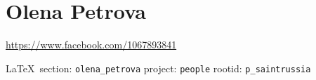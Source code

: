  
 
\section{Olena Petrova}
\url{https://www.facebook.com/1067893841}
  
\vspace{0.5cm}
 {	\ifDEBUG		\small		\LaTeX~section: \verb|olena_petrova| project: \verb|people| rootid: \verb|p_saintrussia|		\fi}
\vspace{0.5cm}
  
